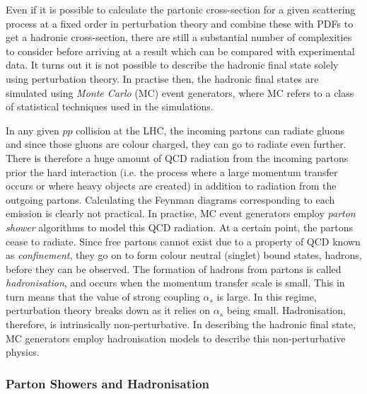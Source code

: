 Even if it is possible to calculate the partonic cross-section for a given scattering process at a fixed order in perturbation theory and combine these with PDFs to get a hadronic cross-section, there are still a substantial number of complexities to consider before arriving at a result which can be compared with experimental data. It turns out it is not possible to describe the hadronic final state solely using perturbation theory. In practise then, the hadronic final states are simulated using \textit{Monte Carlo} (MC) event generators, where MC refers to a class of statistical techniques used in the simulations.

In any given $pp$ collision at the LHC, the incoming partons can radiate gluons and since those gluons are colour charged, they can go to radiate even further. There is therefore a huge amount of QCD radiation from the incoming partons prior the hard interaction (i.e. the process where a large momentum transfer occurs or where heavy objects are created) in addition to radiation from the outgoing partons. Calculating the Feynman diagrams corresponding to each emission is clearly not practical. In practise, MC event generators employ \textit{parton shower} algorithms to model this QCD radiation. At a certain point, the partons cease to radiate. Since free partons cannot exist due to a property of QCD known as \textit{confinement}, they go on to form colour neutral (singlet) bound states, hadrons, before they can be observed. The formation of hadrons from partons is called \textit{hadronisation}, and occurs when the momentum transfer scale is small. This in turn means that the value of strong coupling $\alpha_s$ is large. In this regime, perturbation theory breaks down as it relies on $\alpha_s$ being small. Hadronisation, therefore, is intrinsically non-perturbative. In describing the hadronic final state, MC generators employ hadronisation models to describe this non-perturbative physics.

\subsubsection{Parton Showers and Hadronisation}

